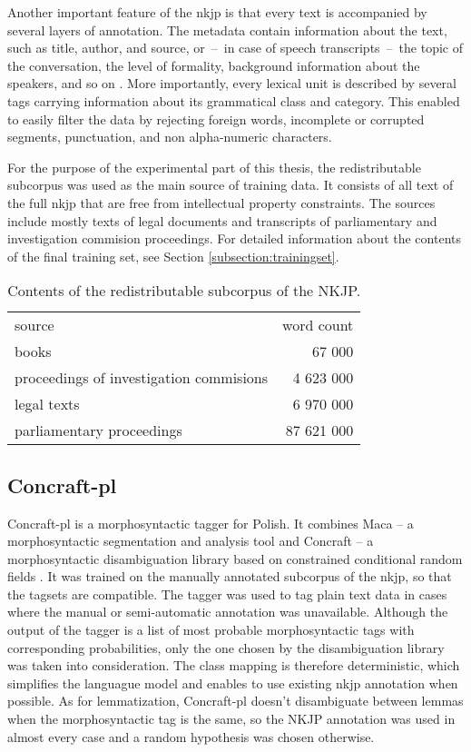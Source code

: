 Another important feature of the \gls{nkjp} is that every text is accompanied by several layers of annotation. The metadata contain information about the text, such as title, author, and source, or~--~in case of speech transcripts~--~the topic of the conversation, the level of formality, background information about the speakers, and so on \cite{przepiorkowski2009xml}. More importantly, every lexical unit is described by several tags carrying information about its grammatical class and category. This enabled to easily filter the data by rejecting foreign words, incomplete or corrupted segments, punctuation, and non alpha-numeric characters. 

For the purpose of the experimental part of this thesis, the redistributable subcorpus was used as the main source of training data. It consists of all text of the full \gls{nkjp} that are free from intellectual property constraints. The sources include mostly texts of legal documents and transcripts of parliamentary and investigation commision proceedings. For detailed information about the contents of the final training set, see Section \ref{subsection:trainingset}.

\begin{table}[h!]
  \begin{center}
	  \caption{Contents of the redistributable subcorpus of the NKJP.}
	    \label{table:freenkjp}
	    \begin{tabular*}{.6\linewidth}{@{\extracolsep{\fill}}lr}
      source & word count \\
      \cmidrule{1-2}
      books & 67 000\\
      proceedings of investigation commisions & 4 623 000\\
      legal texts & 6 970 000\\
      parliamentary proceedings & 87 621 000\\
    \end{tabular*}
  \end{center}
\end{table}

\subsection{Concraft-pl}
Concraft-pl is a morphosyntactic tagger for Polish. It combines Maca -- a morphosyntactic segmentation and analysis tool and Concraft -- a morphosyntactic disambiguation library based on constrained conditional random fields \cite{waszczuk2012harnessing}. It was trained on the manually annotated subcorpus of the \gls{nkjp}, so that the tagsets are compatible. The tagger was used to tag plain text data in cases where the manual or semi-automatic annotation was unavailable. Although the output of the tagger is a list of most probable morphosyntactic tags with corresponding probabilities, only the one chosen by the disambiguation library was taken into consideration. The class mapping is therefore deterministic, which simplifies the languague model and enables to use existing \gls{nkjp} annotation when possible. As for lemmatization, Concraft-pl doesn't disambiguate between lemmas when the morphosyntactic tag is the same, so the NKJP annotation was used in almost every case and a random hypothesis was chosen otherwise.

